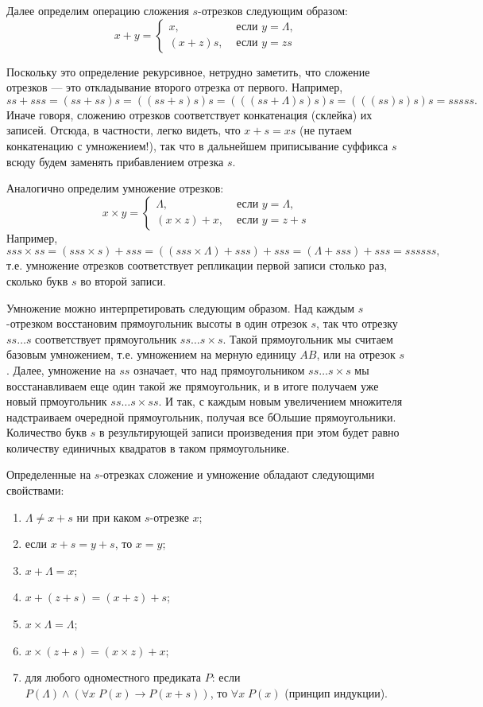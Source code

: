 Далее определим операцию сложения $s$-отрезков следующим образом:
$$
x+y = 
\begin{cases}
x, & \mbox{ если }y=\Lambda,\\
(x+z)s, & \mbox{ если }y=zs
\end{cases}
$$

Поскольку это определение рекурсивное, нетрудно заметить, что сложение отрезков --- это откладывание второго отрезка от первого. Например,
$$
ss+sss = (ss+ss)s = ((ss+s)s)s = (((ss+\Lambda)s)s)s = (((ss)s)s)s = sssss.
$$
Иначе говоря, сложению отрезков соответствует конкатенация (склейка) их записей. Отсюда, в частности, легко видеть, что $x+s=xs$ (не путаем конкатенацию с умножением!), так что в дальнейшем приписывание суффикса $s$ всюду будем заменять прибавлением отрезка $s$.

Аналогично определим умножение отрезков:
$$
x\times y = 
\begin{cases}
\Lambda, & \mbox{ если }y=\Lambda,\\
(x\times z) + x, & \mbox{ если }y=z+s
\end{cases}
$$
Например,
$$
sss\times ss = (sss\times s) + sss = ((sss\times\Lambda) + sss)+sss = (\Lambda + sss) + sss=ssssss,
$$
т.е. умножение отрезков соответствует репликации первой записи столько раз, сколько букв $s$ во второй записи.


Умножение можно интерпретировать следующим образом. Над каждым $s$-отрезком восстановим прямоугольник высоты в один отрезок $s$, так что отрезку $ss\dots s$ соответствует прямоугольник $ss\dots s\times s$. Такой прямоугольник мы считаем базовым умножением, т.е. умножением на мерную единицу $AB$, или на отрезок $s$. Далее, умножение на $ss$ означает, что над прямоугольником $ss\dots s\times s$ мы восстанавливаем еще один такой же прямоугольник, и в итоге получаем уже новый прмоугольник $ss\dots s\times ss$. И так, с каждым новым увеличением множителя надстраиваем очередной прямоугольник, получая все бОльшие прямоугольники. Количество букв $s$ в результирующей записи произведения при этом будет равно количеству единичных квадратов в таком прямоугольнике.

Определенные на $s$-отрезках сложение и умножение обладают следующими свойствами:
\begin{enumerate}[I]
\item $\Lambda\ne x+s$ ни при каком $s$-отрезке $x$;
\item если $x+s=y+s$, то $x=y$;
\item $x+\Lambda=x$;
\item $x+(z+s)=(x+z)+s$;
\item $x\times \Lambda=\Lambda$;
\item $x\times(z+s)=(x\times z)+x$;
\item для любого одноместного предиката $P$: если $P(\Lambda)\land(\forall x \; P(x)\to P(x+s))$, то $\forall x\; P(x)$ (принцип индукции).
\end{enumerate}

